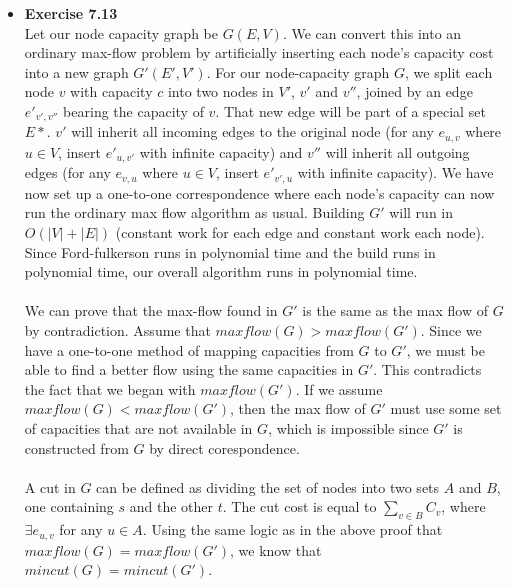\documentclass[a4paper]{article}
\begin{document}
\begin{itemize}
\item{\textbf{Exercise 7.13}} \\
Let our node capacity graph be $G(E,V)$. We can convert this into an ordinary max-flow problem by artificially inserting each node's capacity cost into a new graph $G'(E',V')$. For our node-capacity graph $G$, we split each node $v$ with capacity $c$ into two nodes in $V'$, $v'$ and $v''$, joined by an edge $e'_{v',v''}$ bearing the capacity of $v$. That new edge will be part of a special set $E*$. $v'$ will inherit all incoming edges to the original node (for any $e_{u,v}$ where $u \in V$, insert $e'_{u,v'}$ with infinite capacity) and $v''$ will inherit all outgoing edges (for any $e_{v,u}$ where $u \in V$, insert $e'_{v',u}$ with infinite capacity). We have now set up a one-to-one correspondence where each node's capacity can now run the ordinary max flow algorithm as usual. Building $G'$ will run in $O(|V|+|E|)$ (constant work for each edge and constant work each node). Since Ford-fulkerson runs in polynomial time and the build runs in polynomial time, our overall algorithm runs in polynomial time. \\
\\
We can prove that the max-flow found in $G'$ is the same as the max flow of $G$ by contradiction. Assume that $maxflow(G) > maxflow(G')$. Since we have a one-to-one method of mapping capacities from $G$ to $G'$, we must be able to find a better flow using the same capacities in $G'$. This contradicts the fact that we began with $maxflow(G')$. If we assume $maxflow(G) < maxflow(G')$, then the max flow of $G'$ must use some set of capacities that are not available in $G$, which is impossible since $G'$ is constructed from $G$ by direct corespondence. \\
\\
A cut in $G$ can be defined as dividing the set of nodes into two sets $A$ and $B$, one containing $s$ and the other $t$. The cut cost is equal to $\sum_{v \in B} C_v$, where $\exists e_{u,v}$ for any $u \in A$. Using the same logic as in the above proof that $maxflow(G) = maxflow(G')$, we know that $mincut(G) = mincut(G')$. \\



\end{itemize}
\end{document}
